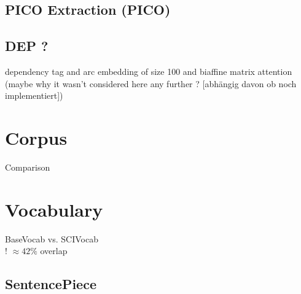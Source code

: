 \subsection{PICO Extraction (PICO)}

\color{ForestGreen}
\subsection{DEP ?}
dependency  tag and arc embedding of size 100 and biaffine matrix attention \\
(maybe why it wasn't considered here any further ? [abhängig davon ob noch implementiert])

\section{Corpus}
Comparison
\section{Vocabulary}
BaseVocab vs. SCIVocab\\
! $\approx 42\%$ overlap
\subsection{SentencePiece}
\color{black}